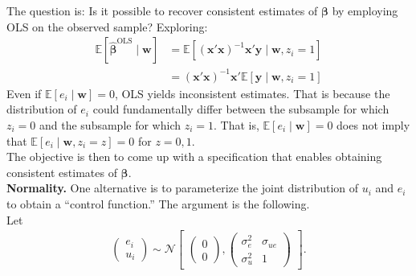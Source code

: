 \noindent The question is: Is it possible to recover consistent estimates of $\bm{\beta}$ by employing OLS on the observed sample? Exploring: 
\begin{align}
		\mathbb{E} \left[ \bm{\hat{\beta}}^{\text{OLS}} \mid \bm{w} \right]  & = \mathbb{E} \left[ { \left( \bm{x}' \bm{x} \right) }^{-1} \bm{x}' \bm{y} \mid \bm{w}, z_{i} = 1 \right] \nonumber \\
		    & = { \left( \bm{x}' \bm{x} \right) }^{-1} \bm{x}'	\mathbb{E} \left[ \bm{y} \mid \bm{w}, z_{i} = 1 \right]
\end{align}
\noindent Even if $\mathbb{E} \left[ e_i \mid \bm{w} \right] = 0$, OLS yields inconsistent estimates. That is because the distribution of $e_i$ could fundamentally differ between the subsample for which $z_i = 0$ and the subsample for which $z_i = 1$. That is, $\mathbb{E} \left[ e_i \mid \bm{w} \right] = 0$ does not imply that $\mathbb{E} \left[ e_i \mid \bm{w}, z_i = z \right] = 0$ for $z = 0,1$.\\ 

\noindent The objective is then to come up with a specification that enables obtaining consistent estimates of $\bm{\beta}$.\\ 

\noindent \textbf{Normality.} One alternative is to parameterize the joint distribution of $u_i$ and $e_i$ to obtain a ``control function.'' The argument is the following.\\

\noindent Let
\begin{align}
	\begin{pmatrix}
		e_i \\
		u_i
	\end{pmatrix} \sim \mathcal{N}
	\begin{bmatrix}
		\begin{pmatrix}
			0 \\ 
			0
		\end{pmatrix}, 
		\begin{pmatrix}
		\sigma_e^2 & \sigma_{ue} \\
		\sigma_u^2 & 1	
		\end{pmatrix}
	\end{bmatrix}. 
\end{align}


